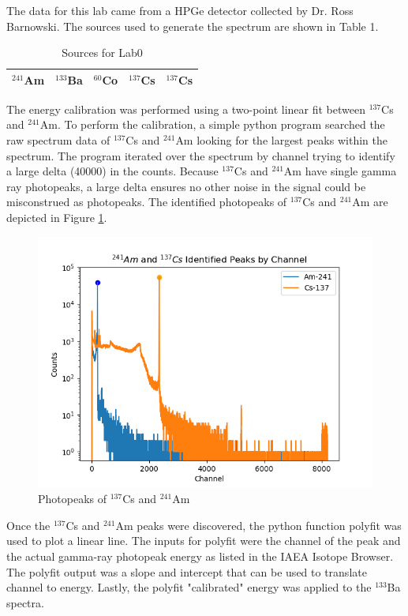 The data for this lab came from a HPGe detector collected by Dr. Ross Barnowski. The sources used to generate the spectrum are shown in Table 1.

\begin{table}[]
\centering
\caption{Sources for Lab0}
\label{my-label}
\begin{tabular}{|l|l|l|l|l|}
\hline
$^{241}$Am & $^{133}$Ba & $^{60}$Co & $^{137}$Cs & $^{137}$Cs \\ \hline
\end{tabular}
\end{table}

The energy calibration was performed using a two-point linear fit between $^{137}$Cs and $^{241}$Am. To perform the calibration, a simple python program searched the raw spectrum data of $^{137}$Cs and $^{241}$Am looking for the largest peaks within the spectrum. The program iterated over the spectrum by channel trying to identify a large delta (40000) in the counts. Because $^{137}$Cs and $^{241}$Am have single gamma ray photopeaks, a large delta ensures no other noise in the signal could be misconstrued as photopeaks. The identified photopeaks of $^{137}$Cs and $^{241}$Am are depicted in Figure \ref{Peaks}.

\begin{figure}[H]
\centering
\includegraphics[scale=0.8]{images/Peaks.png}
\caption{Photopeaks of $^{137}$Cs and $^{241}$Am}
\label{Peaks}
\end{figure}

Once the $^{137}$Cs and $^{241}$Am peaks were discovered, the python function polyfit was used to plot a linear line. The inputs for polyfit were the channel of the peak and the actual gamma-ray photopeak energy as listed in the IAEA Isotope Browser. The polyfit output was a slope and intercept that can be used to translate channel to energy. Lastly, the polyfit "calibrated" energy was applied to the $^{133}$Ba spectra.
